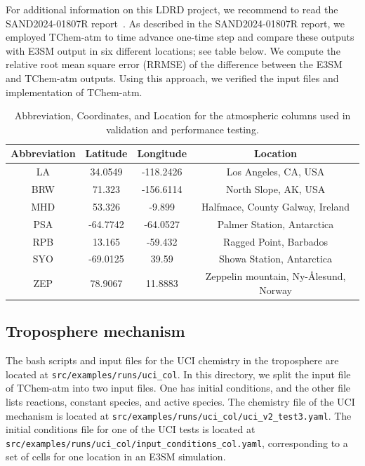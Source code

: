 \documentclass[report, 12pt]{SANDreport}
\begin{document}
For additional information on this LDRD project, we recommend to read the SAND2024-01807R report~\cite{Diaz-Ibarra:2024:tchem}. As described in the SAND2024-01807R report, we employed TChem-atm to time advance one-time step and compare these outputs with E3SM output in six different locations; see table below. We compute the relative root mean square error (RRMSE) of the difference between the E3SM and TChem-atm outputs. Using this approach, we verified the input files and implementation of TChem-atm.


\begin{table}[htbp]
    \centering
    \caption{Abbreviation, Coordinates, and Location for the atmospheric columns used in validation and performance testing.}
    \begin{tabular}{|c|c|c|c|}
        \hline
        Abbreviation & Latitude & Longitude & Location \\
        \hline
        LA & 34.0549 & -118.2426 & Los Angeles, CA, USA \\
        BRW & 71.323 & -156.6114 & North Slope, AK, USA \\
        MHD & 53.326 & -9.899 & Halfmace, County Galway, Ireland \\
        PSA & -64.7742 & -64.0527 & Palmer Station, Antarctica \\
        RPB & 13.165 & -59.432 & Ragged Point, Barbados \\
        SYO & -69.0125 & 39.59 & Showa Station, Antarctica \\
        ZEP & 78.9067 & 11.8883 & Zeppelin mountain, Ny-\AA lesund, Norway \\
        \hline
    \end{tabular}
    \label{tab:location-info}
\end{table}


\subsection{Troposphere mechanism}

The bash scripts and input files for the UCI chemistry in the troposphere are located at \Verb|src/examples/runs/uci_col|. In this directory, we split the input file of TChem-atm into two input files. One has initial conditions, and the other file lists reactions, constant species, and active species. The chemistry file of the UCI mechanism is located at \Verb|src/examples/runs/uci_col/uci_v2_test3.yaml|. The initial conditions file for one of the UCI tests is located at \Verb|src/examples/runs/uci_col/input_conditions_col.yaml|, corresponding to a set of cells for one location in an E3SM simulation.
\end{document}
